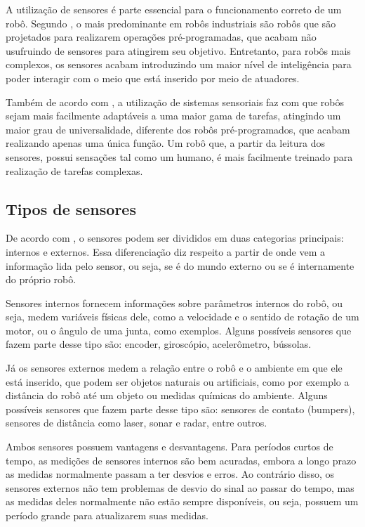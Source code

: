 \documentclass[acronym, symbols]{fei}
\begin{document}
		A utilização de sensores é parte essencial para o funcionamento correto de um robô. Segundo \textcite{de2017tipos}, o mais predominante em robôs industriais são robôs que são projetados para realizarem operações pré-programadas, que acabam não usufruindo de sensores para atingirem seu objetivo. Entretanto, para robôs mais complexos, os sensores acabam introduzindo um maior nível de inteligência para poder interagir com o meio que está inserido por meio de atuadores.
		
		Também de acordo com \textcite{de2017tipos}, a utilização de sistemas sensoriais faz com que robôs sejam mais facilmente adaptáveis a uma maior gama de tarefas, atingindo um maior grau de universalidade, diferente dos robôs pré-programados, que acabam realizando apenas uma única função. Um robô que, a partir da leitura dos sensores, possui sensações tal como um humano, é mais facilmente treinado para realização de tarefas complexas.
		
		\subsection{Tipos de sensores}
		
			De acordo com \textcite{sensorFusionKalmanFilter}, o sensores podem ser divididos em duas categorias principais: internos e externos. Essa diferenciação diz respeito a partir de onde vem a informação lida pelo sensor, ou seja, se é do mundo externo ou se é internamente do próprio robô.
			
			Sensores internos fornecem informações sobre parâmetros internos do robô, ou seja, medem variáveis físicas dele, como a velocidade e o sentido de rotação de um motor, ou o ângulo de uma junta, como exemplos. Alguns possíveis sensores que fazem parte desse tipo são: encoder, giroscópio, acelerômetro, bússolas.
			
			Já os sensores externos medem a relação entre o robô e o ambiente em que ele está inserido, que podem ser objetos naturais ou artificiais, como por exemplo a distância do robô até um objeto ou medidas químicas do ambiente. Alguns possíveis sensores que fazem parte desse tipo são: sensores de contato (bumpers), sensores de distância como laser, sonar e radar, entre outros.
			
			Ambos sensores possuem vantagens e desvantagens. Para períodos curtos de tempo, as medições de sensores internos são bem acuradas, embora a longo prazo as medidas normalmente passam a ter desvios e erros. Ao contrário disso, os sensores externos não tem problemas de desvio do sinal ao passar do tempo, mas as medidas deles normalmente não estão sempre disponíveis, ou seja, possuem um período grande para atualizarem suas medidas.
			
\end{document}
